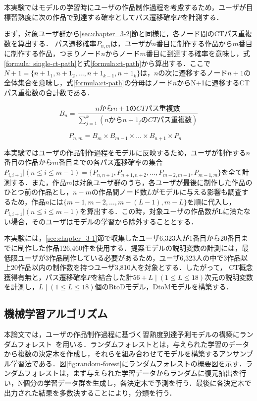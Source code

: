 \documentclass[11pt,dvipdfmx]{jreport}
\begin{document}
本実験ではモデルの学習時にユーザの作品制作過程を考慮するため，ユーザが目標習熟度に次の作品で到達する確率としてパス遷移確率$P$を計測する．

まず，対象ユーザ群から\ref{sec:chapter_3-2}節と同様に，各ノード間のCTパス重複数を算出する．
パス遷移確率$P_{n,m}$は，ユーザが$n$番目に制作する作品から$m$番目に制作する作品，つまりノード$n$からノード$m$番目に到達する確率を意味し，式\ref{formula: single-ct-path}と式\ref{formula:ct-path}から算出する．ここで$N+1=\{ {n + 1}_1, {n + 1}_2,\ldots,{n + 1}_{k-1}, {n + 1}_k  \}$は，$n$の次に遷移するノード$n+1$の全体集合を意味し，式\ref{formula:ct-path}の分母はノード$n$からN+1に遷移するCTパス重複数の合計数である．

\begin{equation}
  B_n = \frac{nからn+1のCT
  パス重複数}{\sum_{j=1}^{k} (nからn+1_jのCTパス重複数)} \label{formula: single-ct-path}
\end{equation}


\begin{equation}\label{formula:ct-path}
  P_{n,m} = B_m \times B_{m-1} \times \ldots \times B_{n+1} \times P_n \quad 
\end{equation}

本実験ではユーザの作品制作過程をモデルに反映するため，ユーザが制作する$n$番目の作品から$m$番目までの各パス遷移確率の集合$P_{i,i+1}|(n \leq i \leq m - 1)=\{P_{n,n+1}, P_{n+1,n+2}, \dots, P_{m-2, m-1}, P_{m-1, m}\}$を全て計測する．また，作品$m$は対象ユーザ群のうち，各ユーザが最後に制作した作品のひとつ前の作品とし，$n-m$の作品間ノード数$L$がモデルに与える影響も調査するため，作品$n$には$\{m-1, m-2,\dots, m-(L-1), m-L\}$を順に代入し，$P_{i,i+1}|(n \leq i \leq m - 1)$を算出する．この時，対象ユーザの作品数がLに満たない場合，そのユーザはモデルの学習から除外することとする．

本実験には，\ref{sec:chapter_3-1}節で収集したユーザ6,323人が1番目から20番目までに制作した作品126,460件を使用する．提案モデルの説明変数の計測には，最低限ユーザが3作品制作している必要があるため，ユーザ6,323人の中で3作品以上20作品以内の制作数を持つユーザ3,810人を対象とする．したがって，
CT概念獲得有無と，パス遷移確率$P$を結合した計$56+L \mid (1 \leq L \leq 18)$次元の説明変数を計測し，$L\mid (1 \leq L \leq 18)$個のBtoDモデル，DtoMモデルを構築する．

\subsection{機械学習アルゴリズム}
本論文では，ユーザの作品制作過程に基づく習熟度到達予測モデルの構築にランダムフォレスト~\cite{Breiman_2001}を用いる．ランダムフォレストとは，与えられた学習のデータから複数の決定木を作成し，それらを組み合わせてモデルを構築するアンサンブル学習法である．図\ref{fig:random-forest}にランダムフォレストの概要図を示す．ランダムフォレストは，まず与えられた学習データからランダムに復元抽出を行い，N個分の学習データ群を生成し，各決定木で予測を行う．最後に各決定木で出力された結果を多数決することにより，分類を行う．
\end{document}
